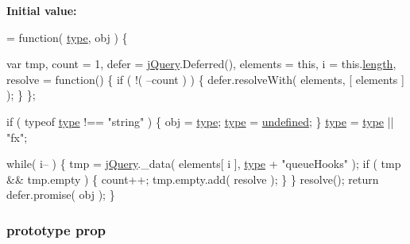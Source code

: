 {\bfseries Initial value\-:}
\begin{DoxyCode}
= \textcolor{keyword}{function}( \hyperlink{jquery-1_810_82-vsdoc_8js_a3940565e83a9bfd10d95ffd27536da91}{type}, obj ) \{


        var tmp,
            count = 1,
            defer = \hyperlink{jquery-1_810_82-vsdoc_8js_add5237586d970a38a81f990e8eb28c6c}{jQuery}.Deferred(),
            elements = \textcolor{keyword}{this},
            i = this.\hyperlink{jquery-1_810_82-vsdoc_8js_aa7de35d58da66d9944ab9cbe82c19640}{length},
            resolve = \textcolor{keyword}{function}() \{
                \textcolor{keywordflow}{if} ( !( --count ) ) \{
                    defer.resolveWith( elements, [ elements ] );
                \}
            \};

        \textcolor{keywordflow}{if} ( typeof \hyperlink{jquery-1_810_82-vsdoc_8js_a3940565e83a9bfd10d95ffd27536da91}{type} !== \textcolor{stringliteral}{"string"} ) \{
            obj = \hyperlink{jquery-1_810_82-vsdoc_8js_a3940565e83a9bfd10d95ffd27536da91}{type};
            \hyperlink{jquery-1_810_82-vsdoc_8js_a3940565e83a9bfd10d95ffd27536da91}{type} = \hyperlink{jquery-1_810_82-vsdoc_8js_a08113a236cc18d2a9d5ce27e638012be}{undefined};
        \}
        \hyperlink{jquery-1_810_82-vsdoc_8js_a3940565e83a9bfd10d95ffd27536da91}{type} = \hyperlink{jquery-1_810_82-vsdoc_8js_a3940565e83a9bfd10d95ffd27536da91}{type} || \textcolor{stringliteral}{"fx"};

        \textcolor{keywordflow}{while}( i-- ) \{
            tmp = \hyperlink{jquery-1_810_82-vsdoc_8js_add5237586d970a38a81f990e8eb28c6c}{jQuery}.\_data( elements[ i ], \hyperlink{jquery-1_810_82-vsdoc_8js_a3940565e83a9bfd10d95ffd27536da91}{type} + \textcolor{stringliteral}{"queueHooks"} );
            \textcolor{keywordflow}{if} ( tmp && tmp.empty ) \{
                count++;
                tmp.empty.add( resolve );
            \}
        \}
        resolve();
        \textcolor{keywordflow}{return} defer.promise( obj );
    \}
\end{DoxyCode}
\hypertarget{jquery-1_810_82-vsdoc_8js_af17be84954030af6c2286f5da385d41b}{
\subsubsection[{prop}]{ {\bf prototype} prop}}\label{jquery-1_810_82-vsdoc_8js_af17be84954030af6c2286f5da385d41b}
